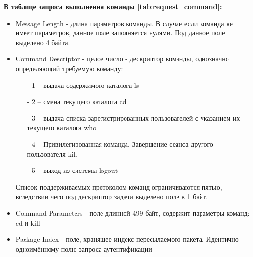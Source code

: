 \textbf{В таблице запроса выполнения команды \ref{tab:request_command}:}
\begin{itemize}
\item Message Length - длина параметров команды. В случае если команда не имеет параметров, данное поле заполняется нулями. Под данное поле выделено 4 байта.
\item Command Descriptor - целое число - дескриптор команды, однозначно определяющий требуемую команду:
\begin{itemize}
\item[-] 1 – выдача содержимого каталога ls
\item[-] 2 – смена текущего каталога cd
\item[-] 3 – выдача списка зарегистрированных пользователей с указанием их текущего каталога who
\item[-] 4 – Привилегированная команда. Завершение сеанса другого пользователя kill
\item[-] 5 – выход из системы logout
\end{itemize}
Список поддерживаемых протоколом команд ограничиваются пятью, вследствии чего под дескриптор задачи выделено поле в 1 байт.

\item Command Parameters - поле длинной 499 байт, содержит параметры команд: cd и kill
\item Package Index - поле, хранящее индекс пересылаемого пакета. Идентично одноимённому полю запроса аутентификации
\end{itemize}






